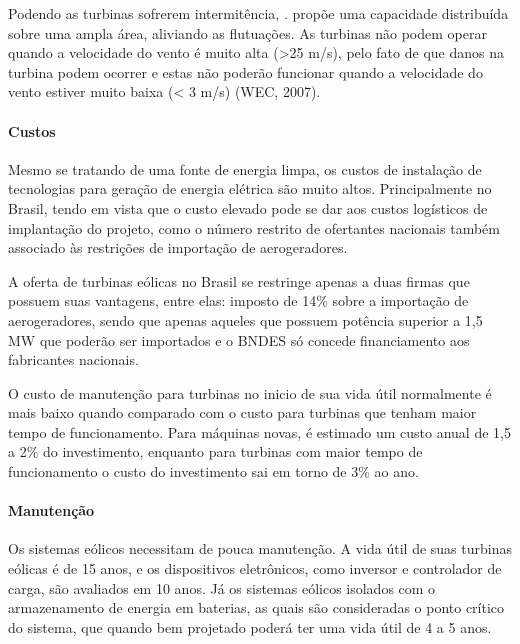   Podendo as turbinas sofrerem intermitência, \cite{edmondes2007}. propõe uma capacidade distribuída sobre uma ampla área, aliviando as flutuações. As turbinas não podem operar quando a velocidade do vento é muito alta (>25 m/s), pelo fato de que danos na turbina podem ocorrer e estas não poderão funcionar quando a velocidade do vento estiver muito baixa (< 3 m/s) (WEC, 2007).
  
  \paragraph{Custos}
  Mesmo se tratando de uma fonte de energia limpa, os custos de instalação de tecnologias para geração de energia elétrica são muito altos. Principalmente no Brasil, tendo em vista que o custo elevado pode se dar aos custos logísticos de implantação do projeto, como o número restrito de ofertantes nacionais também associado às restrições de importação de aerogeradores.
  
  A oferta de turbinas eólicas no Brasil se restringe apenas a duas firmas que possuem suas vantagens, entre elas: imposto de 14\% sobre a importação de aerogeradores, sendo que apenas aqueles que possuem potência superior a 1,5 MW que poderão ser importados e o BNDES só concede financiamento aos fabricantes nacionais.

  O custo de manutenção para turbinas no inicio de sua vida útil normalmente é mais baixo quando comparado com o custo para turbinas que tenham maior tempo de funcionamento. Para máquinas novas, é estimado um custo anual de 1,5 a 2\% do investimento, enquanto para turbinas com maior tempo de funcionamento o custo do investimento sai em torno de 3\% ao ano.
  
  \paragraph{Manutenção}
  Os sistemas eólicos necessitam de pouca manutenção. A vida útil de suas turbinas eólicas é de 15 anos, e os dispositivos eletrônicos, como inversor e controlador de carga, são avaliados em 10 anos. Já os sistemas eólicos isolados com o armazenamento de energia em baterias, as quais são consideradas o ponto crítico do sistema, que quando bem projetado poderá ter uma vida útil de 4 a 5 anos.


